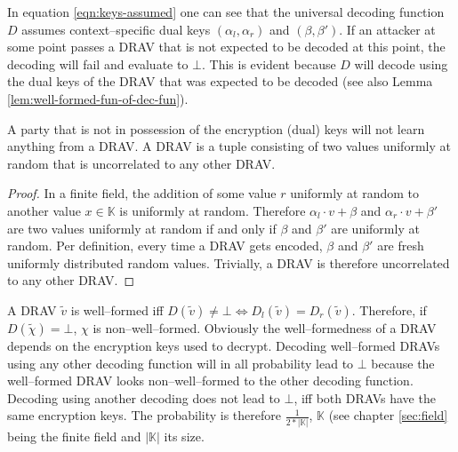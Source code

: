 \noindent{}In equation \ref{eqn:keys-assumed} one can see that the universal
decoding function $D$ assumes context--specific  dual keys $(\alpha_l,
\alpha_r)$ and $(\beta, \beta')$. If an attacker at some point passes a DRAV
that is not expected to be decoded at this point, the decoding will fail and
evaluate to $\bot$. This is evident because $D$ will decode using the dual keys
of the DRAV that was expected to be decoded (see also Lemma
\ref{lem:well-formed-fun-of-dec-fun}).

\begin{lem}
  \label{lem:DRAV-random}

  A party that is not in possession of the encryption (dual) keys will not learn
  anything from a DRAV\@. A DRAV is a tuple consisting of two values uniformly
  at random that is uncorrelated to any other DRAV\@.

\end{lem}
\begin{proof}

  In a finite field, the addition of some value $r$ uniformly at random to
  another value $x \in \mathbb{K}$ is uniformly at random. Therefore $\alpha_l
  \cdot v + \beta$ and $\alpha_r \cdot v + \beta'$ are two values uniformly at
  random if and only if $\beta$ and $\beta'$ are uniformly at random. Per
  definition, every time a DRAV gets encoded, $\beta$ and $\beta'$ are fresh
  uniformly distributed random values. Trivially, a DRAV is therefore
  uncorrelated to any other DRAV\@.

\end{proof}


\label{sec:well-formed-DRAV}

A DRAV $\widetilde{v}$ is well--formed iff $D(\widetilde{v}) \neq \bot
\Leftrightarrow D_l(\widetilde{v}) = D_r(\widetilde{v})$. Therefore, if
$D(\widetilde{\chi}) = \bot$, $\chi$ is non--well--formed. Obviously the
well--formedness of a DRAV depends on the encryption keys used to decrypt.
Decoding well--formed DRAVs using any other decoding function will in all
probability lead to $\bot$ because the well--formed DRAV looks non--well--formed
to the other decoding function. Decoding using another decoding does not lead to
$\bot$, iff both DRAVs have the same encryption keys. The probability is
therefore $\frac{1}{2*|\mathbb{K}|}$, $\mathbb{K}$ (see chapter \ref{sec:field}
being the finite field and $|\mathbb{K}|$ its size.

